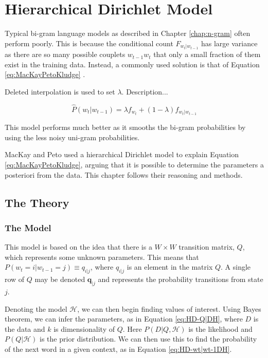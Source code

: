 \chapter{Hierarchical Dirichlet Model} \label{chap:HierarchicalDirichletModel}

Typical bi-gram language models as described in Chapter \ref{chap:n-gram} often perform poorly. This is because the conditional count $F_{w_{t}|w_{t-1}}$ has large variance as there are so many possible couplets $w_{t-1}w_{t}$ that only a small fraction of them exist in the training data. Instead, a commonly used solution is that of Equation \ref{eq:MacKayPetoKludge} \cite{mackay1995hierarchical}. 

Deleted interpolation \cite{jelinek1980interpolated} is used to set $\lambda$. Description...


\begin{equation}
\hat{P}(w_{t}|w_{t-1})=\lambda f_{w_{t}}+(1-\lambda)f_{w_{t}|w_{t-1}}
\label{eq:MacKayPetoKludge}
\end{equation}

\noindent This model performs much better as it smooths the bi-gram probabilities by using the less noisy uni-gram probabilities.



MacKay and Peto \cite{mackay1995hierarchical} used a hierarchical Dirichlet model to explain Equation \ref{eq:MacKayPetoKludge}, arguing that it is possible to determine the parameters a posteriori from the data. This chapter follows their reasoning and methods.

\section{The Theory}

\subsection{The Model}

This model is based on the idea that there is a $W\times W$ transition matrix, $Q$, which represents some unknown parameters. This means that $P(w_{t}=i|w_{t-1}=j)\equiv q_{i|j}$, where $q_{i|j}$ is an element in the matrix $Q$. A single row of $Q$ may be denoted $\boldsymbol{q}_{|j}$ and represents the probability transitions from state $j$.

Denoting the model $\mathscr{H}$, we can then begin finding values of interest. Using Bayes theorem, we can infer the parameters, as in Equation \ref{eq:HD-Q|DH}, where $D$ is the data and $k$ is dimensionality of $Q$. Here $P(D|Q,\mathscr{H})$ is the likelihood and $P(Q|\mathscr{H})$ is the prior distribution. We can then use this to find the probability of the next word in a given context, as in Equation \ref{eq:HD-wt|wt-1DH}.

